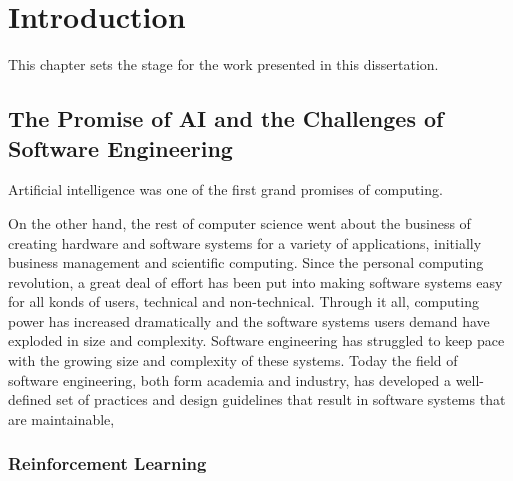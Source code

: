 \chapter{Introduction}

This chapter sets the stage for the work presented in this dissertation.

\section{The Promise of AI and the Challenges of Software Engineering}

Artificial intelligence was one of the first grand promises of computing.

On the other hand, the rest of computer science went about the business of creating hardware and software systems for a variety of applications, initially business management and scientific computing.  Since the personal computing revolution, a great deal of effort has been put into making software systems easy for all konds of users, technical and non-technical.  Through it all, computing power has increased dramatically and the software systems users demand have exploded in size and complexity.  Software engineering has struggled to keep pace with the growing size and complexity of these systems. Today the field of software engineering, both form academia and industry, has developed a well-defined set of practices and design guidelines that result in software systems that are maintainable,

\subsection{Reinforcement Learning}


